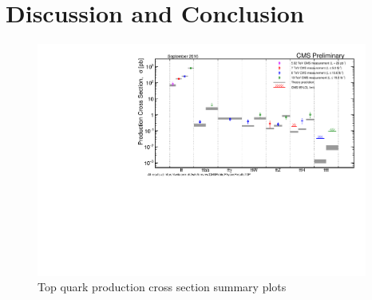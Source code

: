 \chapter{Discussion and Conclusion}
\label{c:DandC}


\begin{figure}[ht!]
\begin{center}
    \includegraphics[width=0.97\textwidth]{images/Conclusion/ttplusx_staircase.pdf}
    \caption{Top quark production cross section summary plots}
    \label{fig:ttbarXstairway}
\end{center}
\end{figure}

